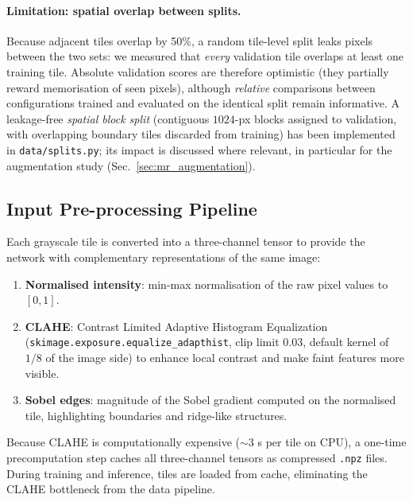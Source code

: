 \paragraph{Limitation: spatial overlap between splits.}
Because adjacent tiles overlap by 50\%, a random tile-level split leaks pixels between the two sets: we measured that \emph{every} validation tile overlaps at least one training tile. Absolute validation scores are therefore optimistic (they partially reward memorisation of seen pixels), although \emph{relative} comparisons between configurations trained and evaluated on the identical split remain informative. A leakage-free \emph{spatial block split} (contiguous $1024$-px blocks assigned to validation, with overlapping boundary tiles discarded from training) has been implemented in \texttt{data/splits.py}; its impact is discussed where relevant, in particular for the augmentation study (Sec.~\ref{sec:mr_augmentation}).

\subsection{Input Pre-processing Pipeline}
\label{sec:mr_preprocessing}

Each grayscale tile is converted into a three-channel tensor to provide the network with complementary representations of the same image:

\begin{enumerate}
    \item \textbf{Normalised intensity}: min-max normalisation of the raw pixel values to $[0,1]$.
    \item \textbf{CLAHE}: Contrast Limited Adaptive Histogram Equalization (\texttt{skimage.exposure.equalize\_adapthist}, clip limit $0.03$, default kernel of $1/8$ of the image side) to enhance local contrast and make faint features more visible.
    \item \textbf{Sobel edges}: magnitude of the Sobel gradient computed on the normalised tile, highlighting boundaries and ridge-like structures.
\end{enumerate}

\noindent
Because CLAHE is computationally expensive (${\sim}3$ s per tile on CPU), a one-time precomputation step caches all three-channel tensors as compressed \texttt{.npz} files. During training and inference, tiles are loaded from cache, eliminating the CLAHE bottleneck from the data pipeline.

